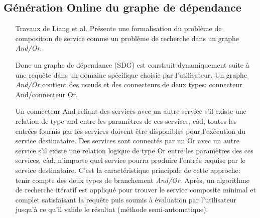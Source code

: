   \subsection{Génération Online du graphe de dépendance}
  \label{sec:generation-online}
    \SpecialItem
    \begin{itemize}        
    \item[Travaux de Liang et al. \cite{liang2005and}] Présente une
      formalisation du problème de composition de service comme un
      problème de recherche dans un graphe \textit{And/Or}.

      Donc un graphe de dépendance (SDG) est construit dynamiquement
      suite à une requête dans un domaine spécifique choisie par
      l'utilisateur. Un graphe \textit{And/Or} contient des nœuds et
      des connecteurs de deux types: connecteur And/connecteur Or.

      Un connecteur And reliant des services avec un autre service
      s'il existe une relation de type and entre les paramètres de ces
      services, càd, toutes les entrées fournis par les services
      doivent être disponibles pour l'exécution du service
      destinataire. Des services sont connectés par un Or avec un
      autre service s'il existe une relation logique de type Or entre
      les paramètres des ces services, càd, n'importe quel service
      pourra produire l'entrée requise par le service
      destinataire. C'est la caractéristique principale de cette
      approche: tenir compte des deux types de branchement
      \textit{And/Or}.  Après, un algorithme de recherche itératif est
      appliqué pour trouver le service composite minimal et complet
      satisfaisant la requête puis soumis à évaluation par
      l'utilisateur jusqu'à ce qu'il valide le résultat (méthode
      semi-automatique).



\end{itemize}
